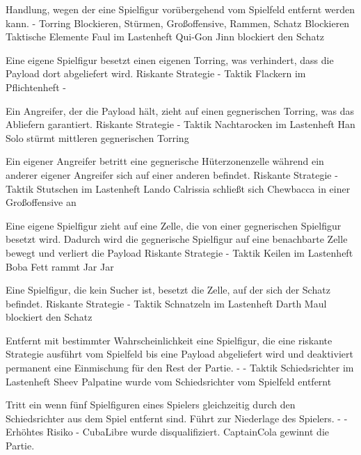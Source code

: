 {Handlung, wegen der eine Spielfigur vorübergehend vom Spielfeld entfernt werden kann.}
{-}
{Torring Blockieren, Stürmen, Großoffensive, Rammen, Schatz Blockieren}
{Taktische Elemente}
{\glqq{}Faul\grqq{}  im Lastenheft}
{Qui-Gon Jinn blockiert den Schatz}

{Eine eigene Spielfigur besetzt einen eigenen Torring, was verhindert, dass die Payload dort abgeliefert wird.}
{Riskante Strategie}
{-}
{Taktik}
{\glqq{}Flackern\grqq{}  im Pflichtenheft}
{-}

{Ein Angreifer, der die Payload hält, zieht auf einen gegnerischen Torring, was das Abliefern garantiert.}
{Riskante Strategie}
{-}
{Taktik}
{\glqq{}Nachtarocken\grqq{}  im Lastenheft}
{Han Solo stürmt mittleren gegnerischen Torring}

{Ein eigener Angreifer betritt eine gegnerische Hüterzonenzelle während ein anderer eigener Angreifer sich auf einer anderen befindet.}
{Riskante Strategie}
{-}
{Taktik}
{\glqq{}Stutschen\grqq{}  im Lastenheft}
{Lando Calrissia schließt sich Chewbacca in einer Großoffensive an}

{Eine eigene Spielfigur zieht auf eine Zelle, die von einer gegnerischen Spielfigur besetzt wird. Dadurch wird die gegnerische Spielfigur auf eine benachbarte Zelle bewegt und verliert die Payload}
{Riskante Strategie}
{-}
{Taktik}
{\glqq{}Keilen\grqq{}  im Lastenheft}
{Boba Fett rammt Jar Jar}

{Eine Spielfigur, die kein Sucher ist, besetzt die Zelle, auf der sich der Schatz befindet.}
{Riskante Strategie}
{-}
{Taktik}
{\glqq{}Schnatzeln\grqq{}  im Lastenheft}
{Darth Maul blockiert den Schatz}

{Entfernt mit bestimmter Wahrscheinlichkeit eine Spielfigur, die eine riskante Strategie ausführt vom Spielfeld bis eine Payload abgeliefert wird und deaktiviert permanent eine Einmischung für den Rest der Partie.}
{-}
{-}
{Taktik}
{\glqq{}Schiedsrichter\grqq{}  im Lastenheft}
{Sheev Palpatine wurde vom Schiedsrichter vom Spielfeld entfernt}

{Tritt ein wenn fünf Spielfiguren eines Spielers gleichzeitig durch den Schiedsrichter aus dem Spiel entfernt sind. Führt zur Niederlage des Spielers.}
{-}
{-}
{Erhöhtes Risiko}
{-}
{CubaLibre wurde disqualifiziert. CaptainCola gewinnt die Partie.}